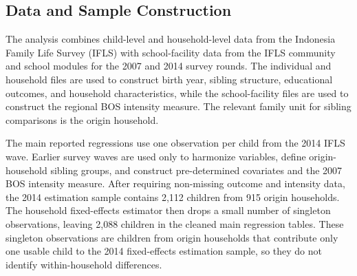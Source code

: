 \documentclass[a4paper, 12pt]{article}
\begin{document}
\begin{doublespacing}
\subsection{Data and Sample Construction}
The analysis combines child-level and household-level data from the Indonesia Family Life Survey (IFLS) with school-facility data from the IFLS community and school modules for the 2007 and 2014 survey rounds. The individual and household files are used to construct birth year, sibling structure, educational outcomes, and household characteristics, while the school-facility files are used to construct the regional BOS intensity measure. The relevant family unit for sibling comparisons is the origin household.

The main reported regressions use one observation per child from the 2014 IFLS wave. Earlier survey waves are used only to harmonize variables, define origin-household sibling groups, and construct pre-determined covariates and the 2007 BOS intensity measure. After requiring non-missing outcome and intensity data, the 2014 estimation sample contains 2,112 children from 915 origin households. The household fixed-effects estimator then drops a small number of singleton observations, leaving 2,088 children in the cleaned main regression tables. These singleton observations are children from origin households that contribute only one usable child to the 2014 fixed-effects estimation sample, so they do not identify within-household differences.




\end{doublespacing}
\end{document}
